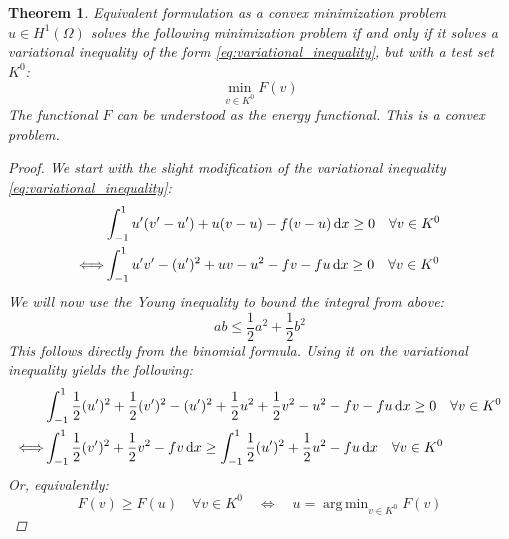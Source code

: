\documentclass[headsepline,footsepline,footinclude=false,oneside,fontsize=11pt,paper=a4,listof=totoc,bibliography=totoc]{scrbook} %
\DeclareMathOperator*{\argmin}{arg\,min}
\newtheorem{theorem}{Theorem}
\begin{document}
\begin{theorem} Equivalent formulation as a convex minimization problem\newline
	$u \in H^1(\Omega)$ solves the following minimization problem if and only if it solves a variational inequality of the form \eqref{eq:variational_inequality}, but with a test set $K^0$:
	\begin{equation} \label{eq:minimization_problem}
	\min_{v \in K^0} F(v)
	\end{equation}
	The functional $F$ can be understood as the energy functional. This is a convex problem.
	\begin{proof}
	We start with the slight modification of the variational inequality \eqref{eq:variational_inequality}:
	\begin{align*}
		&\int_{-1}^1 u'(v'-u') + u(v-u) - f(v-u) \dif x \geq 0 \quad \forall v \in K^0 \\
		\Longleftrightarrow & \int_{-1}^1 u'v' - (u')^2 + uv - u^2 - fv - fu \dif x \geq 0 \quad \forall v \in K^0 \\
	\end{align*}
	We will now use the Young inequality to bound the integral from above:
	\begin{equation}
	ab \leq \frac{1}{2} a^2 + \frac{1}{2} b^2 \label{eq:binomial_inequality}
	\end{equation}
	This follows directly from the binomial formula. Using it on the variational inequality yields the following:
	\begin{align*}
	&\int_{-1}^1 \frac{1}{2} (u')^2 + \frac{1}{2} (v')^2 - (u')^2 + \frac{1}{2} u^2 + \frac{1}{2} v^2 - u^2 - fv - fu \dif x \geq 0 \quad \forall v \in K^0 \\
	\Longleftrightarrow & \int_{-1}^1 \frac{1}{2} (v')^2 + \frac{1}{2} v^2 - fv \dif x \geq \int_{-1}^1 \frac{1}{2} (u')^2 + \frac{1}{2} u^2 - fu \dif x \quad \forall v \in K^0
	\end{align*}
	Or, equivalently:
	\begin{equation*}
	F(v) \geq F(u) \quad \forall v \in K^0
	\quad \Longleftrightarrow \quad u = \argmin_{v \in K^0} F(v)
	\end{equation*}
	

\end{proof}
\end{theorem}
\end{document}

